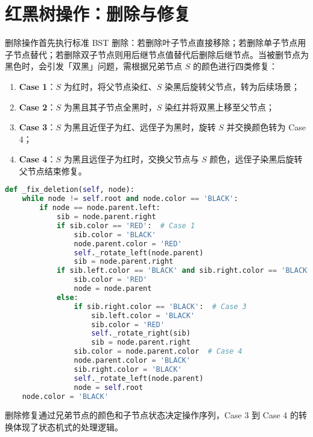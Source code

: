 \chapter{红黑树操作：删除与修复}
删除操作首先执行标准 BST 删除：若删除叶子节点直接移除；若删除单子节点用子节点替代；若删除双子节点则用后继节点值替代后删除后继节点。当被删节点为黑色时，会引发「双黑」问题，需根据兄弟节点 $S$ 的颜色进行四类修复：\par
\begin{enumerate}
\item \textbf{Case 1}：$S$ 为红时，将父节点染红、$S$ 染黑后旋转父节点，转为后续场景；
\item \textbf{Case 2}：$S$ 为黑且其子节点全黑时，$S$ 染红并将双黑上移至父节点；
\item \textbf{Case 3}：$S$ 为黑且近侄子为红、远侄子为黑时，旋转 $S$ 并交换颜色转为 Case 4；
\item \textbf{Case 4}：$S$ 为黑且远侄子为红时，交换父节点与 $S$ 颜色，远侄子染黑后旋转父节点结束修复。
\end{enumerate}
\begin{lstlisting}[language=python]
def _fix_deletion(self, node):
    while node != self.root and node.color == 'BLACK':
        if node == node.parent.left:
            sib = node.parent.right
            if sib.color == 'RED':  # Case 1
                sib.color = 'BLACK'
                node.parent.color = 'RED'
                self._rotate_left(node.parent)
                sib = node.parent.right
            if sib.left.color == 'BLACK' and sib.right.color == 'BLACK':  # Case 2
                sib.color = 'RED'
                node = node.parent
            else:
                if sib.right.color == 'BLACK':  # Case 3
                    sib.left.color = 'BLACK'
                    sib.color = 'RED'
                    self._rotate_right(sib)
                    sib = node.parent.right
                sib.color = node.parent.color  # Case 4
                node.parent.color = 'BLACK'
                sib.right.color = 'BLACK'
                self._rotate_left(node.parent)
                node = self.root
    node.color = 'BLACK'
\end{lstlisting}
删除修复通过兄弟节点的颜色和子节点状态决定操作序列，Case 3 到 Case 4 的转换体现了状态机式的处理逻辑。\par
